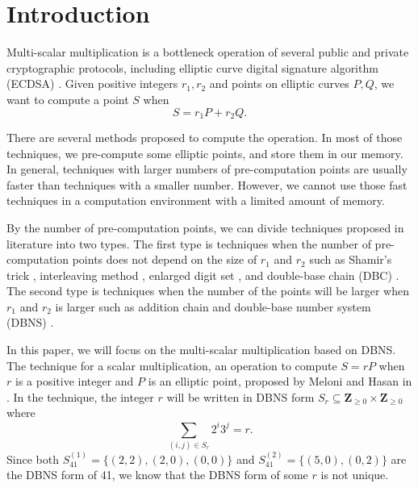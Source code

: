 \section{Introduction}

Multi-scalar multiplication is a bottleneck operation of several public and private cryptographic protocols, including elliptic curve digital signature algorithm (ECDSA) \cite{ECDSA}. Given positive integers $r_1, r_2$ and points on elliptic curves $P, Q$, we want to compute a point $S$ when 
$$S = r_1 P + r_2 Q.$$

There are several methods proposed to compute the operation. In most of those techniques, we pre-compute some elliptic points, and store them in our memory. In general, techniques with larger numbers of pre-computation points are usually faster than techniques with a smaller number. However, we cannot use those fast techniques in a computation environment with a limited amount of memory. 

By the number of pre-computation points, we can divide techniques proposed in literature into two types. The first type is techniques when the number of pre-computation points does not depend on the size of $r_1$ and $r_2$ such as Shamir’s trick \cite{Shamir}, interleaving method \cite{interleaving}, enlarged digit set \cite{enlarged2,enlarged4,enlarged1,enlarged3}, and double-base chain (DBC) \cite{dbc2,dbc3,dbc1}. The second type is techniques when the number of the points will be larger when $r_1$ and $r_2$ is larger such as addition chain \cite{additionChain1,additionChain2} and double-base number system (DBNS)  \cite{dbns}.

In this paper, we will focus on the multi-scalar multiplication based on DBNS. The technique for a scalar multiplication, an operation to compute $S = rP$ when $r$ is a positive integer and $P$ is an elliptic point, proposed by Meloni and Hasan in \cite{dbns}.  In the technique, the integer $r$ will be written in DBNS form $S_r \subseteq \mathbf{Z}_{\geq 0} \times \mathbf{Z}_{\geq 0}$ where
$$\sum_{(i,j) \in S_r} 2^i 3^j = r.$$ 
Since both $S^{(1)}_{41} = \{(2,2), (2,0), (0,0)\}$ and $S^{(2)}_{41} = \{(5,0), (0,2)\}$ are the DBNS form of 41, we know that the DBNS form of some $r$ is not unique.


